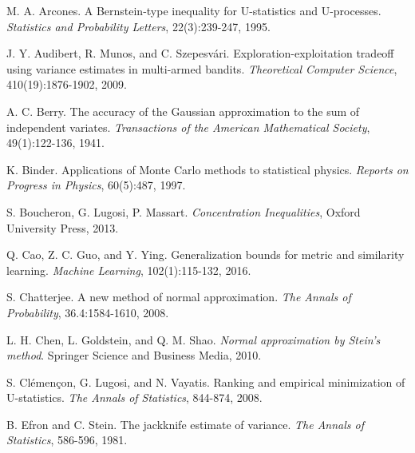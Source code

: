 \documentclass[final,12pt]{colt2018} %
\begin{document}
						\begin{thebibliography}{99}
							 M. A. Arcones. A Bernstein-type inequality
							for U-statistics and U-processes. {\em Statistics and Probability Letters}, 22(3):239-247, 1995.
							
							 J. Y. Audibert, R. Munos, and C. Szepesv\'ari. Exploration-exploitation tradeoff using variance estimates in multi-armed bandits. {\em Theoretical Computer Science}, 410(19):1876-1902, 2009.
							
							 A. C. Berry. The accuracy of the Gaussian
							approximation to the sum of independent variates. {\em Transactions of the
								American Mathematical Society}, 49(1):122-136, 1941.
							
							 K. Binder. Applications of Monte Carlo methods
							to statistical physics. {\em Reports on Progress in Physics}, 60(5):487, 1997.
							
							 S. Boucheron, G. Lugosi, P. Massart. {\em Concentration
								Inequalities}, Oxford University Press, 2013.
							
							 Q. Cao, Z. C. Guo, and Y. Ying. Generalization
							bounds for metric and similarity learning. {\em Machine Learning}, 102(1):115-132, 2016.
							
							 S. Chatterjee. A new method of normal
							approximation. {\em The Annals of Probability}, 36.4:1584-1610, 2008.
							
							 L. H. Chen, L. Goldstein, and Q. M. Shao. 
							\textit{Normal approximation by Stein's method}. Springer Science and
							Business Media, 2010.
							
							 S. Cl\'{e}men\c{c}on, G. Lugosi, and N. Vayatis. 
							Ranking and empirical minimization of U-statistics. {\em The Annals of
								Statistics}, 844-874, 2008.
							
							 B. Efron and C. Stein. The jackknife estimate
							of variance. {\em The Annals of Statistics}, 586-596, 1981.
							
							

\end{thebibliography}
\end{document}
